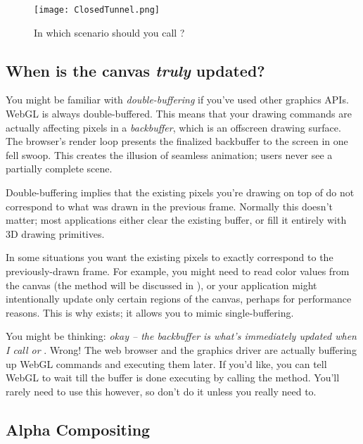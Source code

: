 \begin{figure}[htb]\centering
  \texttt{[image: ClosedTunnel.png]}
  \caption{In which scenario should you call ?}
  \label{fig:Tunnel}
\end{figure}

\subsection{When is the canvas \emph{truly} updated?}
\label{sec:doublebuffer}

You might be familiar with  \emph{double-buffering} if you've used other graphics APIs.  WebGL is always double-buffered.  This means that your drawing commands are actually affecting pixels in a  \emph{backbuffer}, which is an offscreen drawing surface.  The browser's render loop presents the finalized backbuffer to the screen in one fell swoop.  This creates the illusion of seamless animation; users never see a partially complete scene.

Double-buffering implies that the existing pixels you're drawing on top of do not correspond to what was drawn in the previous frame.  Normally this doesn't matter; most applications either clear the existing buffer, or fill it entirely with 3D drawing primitives.

In some situations you want the existing pixels to exactly correspond to the previously-drawn frame.  For example, you might need to read color values from the canvas (the   method will be discussed in ), or your application might intentionally update only certain regions of the canvas, perhaps for performance reasons.  This is why  exists; it allows you to mimic  single-buffering.

You might be thinking: \emph{okay -- the backbuffer is what's immediately updated when I call  or }.  Wrong!  The web browser and the graphics driver are actually buffering up WebGL commands and executing them later.  If you'd like, you can tell WebGL to wait till the buffer is done executing by calling the   method.  You'll rarely need to use this however, so don't do it unless you really need to.

\subsection{Alpha Compositing}

